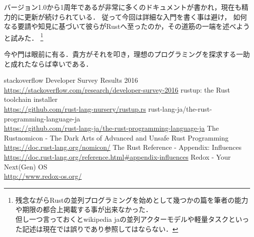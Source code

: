 バージョン1.0から1周年であるが非常に多くのドキュメントが書かれ，現在も精力的に更新が続けられている．
従って今回は詳細な入門を書く事は避け，
如何なる要請や知見に基づいて彼らがRustへ至ったのか，その道筋の一端を述べようと試みた．
\footnote{残念ながらRustの並列プログラミングを始めとして幾つかの篇を筆者の能力や期限の都合上掲載する事が出来なかった．
  \\ 但し一つ言っておくとwikipedia jaの並列アクターモデルや軽量タスクといった記述は現在では誤りであり参照してはならない．}

今や門は眼前に有る．貴方がそれを叩き，理想のプログラミングを探求する一助と成れたならば幸いである．

\begin{thebibliography}{9}
 stackoverflow Developer Survey Results 2016 \\
  \url{https://stackoverflow.com/research/developer-survey-2016}
 rustup: the Rust toolchain installer \\
  \url{https://github.com/rust-lang-nursery/rustup.rs}
 rust-lang-ja/the-rust-programming-language-ja \\
  \url{https://github.com/rust-lang-ja/the-rust-programming-language-ja}
 The Rustnomicon - The Dark Arts of Advanced and Unsafe Rust Programming \\
  \url{https://doc.rust-lang.org/nomicon/}
 The Rust Reference - Appendix: Influences \\
  \url{https://doc.rust-lang.org/reference.html#appendix-influences}
 Redox - Your Next(Gen) OS \\
  \url{http://www.redox-os.org/}
\end{thebibliography}
